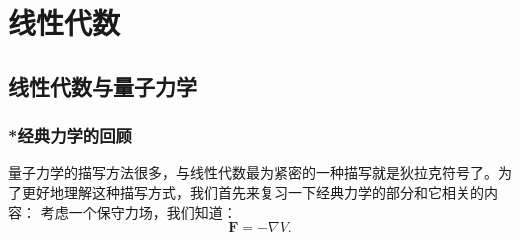 \documentclass[../main.tex]{subfiles}
\begin{document}
\setcounter{chapter}{2}
\chapter{线性代数}\label{cha:linear_algebra}
\section{线性代数与量子力学}
\subsection{*经典力学的回顾}
    量子力学的描写方法很多，与线性代数最为紧密的一种描写就是狄拉克符号了。为了更好地理解这种描写方式，我们首先来复习一下经典力学的部分和它相关的内容：
    考虑一个保守力场，我们知道：
    \begin{equation}
        \mathbf{F}= -\nabla V.
    \end{equation}
\end{document}
